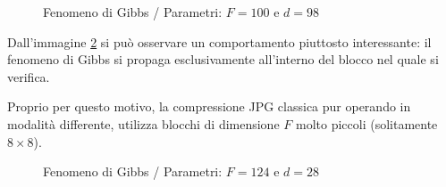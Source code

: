 \documentclass[11pt,italian]{article}
\begin{document}
\vfill
\begin{figure}[H]
    \caption{Fenomeno di Gibbs / Parametri: $F=100$ e $d=98$}
    \label{fig:c-scale-gibbs}
\end{figure}

\newpage
\noindent
Dall'immagine \cref{fig:deer-gibbs} si può osservare un comportamento piuttosto interessante: il fenomeno di Gibbs si propaga esclusivamente all'interno del blocco nel quale si verifica.

Proprio per questo motivo, la compressione JPG classica pur operando in modalità differente, utilizza blocchi di dimensione $F$ molto piccoli (solitamente $8\times 8$).

\begin{figure}[H]
    \caption{Fenomeno di Gibbs / Parametri: $F=124$ e $d=28$}
    \label{fig:deer-gibbs}
\end{figure}


\newpage
\end{document}

